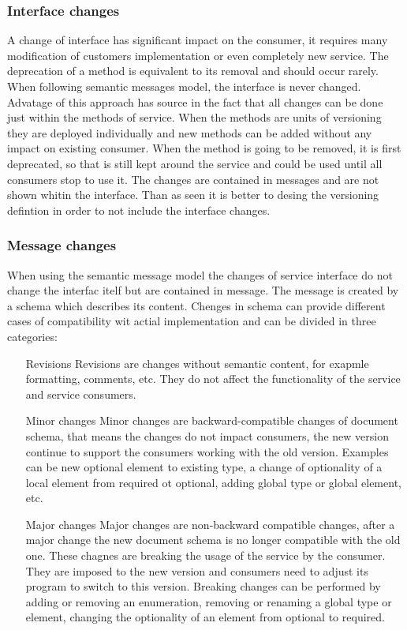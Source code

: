 \subsubsection{Interface changes}
A change of interface has significant impact on the consumer, it requires many modification of customers implementation or even completely new service. The deprecation of a method is equivalent to its removal and should occur rarely.
When following semantic messages model, the interface is never changed. Advatage of this approach has source in the fact that all changes can be done just within the methods of service. When the methods are units of versioning they are deployed individually and new methods can be added without any impact on existing consumer. When the method is going to be removed, it is first deprecated, so that is still kept around the service and could be used until all consumers stop to use it. The changes are contained in messages and are not shown whitin the interface.
Than as seen it is better to desing the versioning defintion in order to not include the interface changes.

\subsubsection{Message changes}
When using the semantic message model the changes of service interface do not change the interfac itelf but are contained in message. The message is created by a schema which describes its content. Chenges in schema can provide different cases of compatibility wit actial implementation and can be divided in three categories:

\begin{enumerate}
  \item[Revisions]
  Revisions are changes without semantic content, for exapmle formatting, comments, etc. They do not affect the functionality of the service and service consumers.
  
  \item[Minor changes]
  Minor changes are backward-compatible changes of document schema, that means the changes do not impact consumers, the new version continue to support the consumers working with the old version. Examples can be new optional element to existing type, a change of optionality of a local element from required ot optional, adding global type or global element, etc.
  
  \item[Major changes]
  Major changes are non-backward compatible changes, after a major change the new document schema is no longer compatible with the old one. These chagnes are breaking the usage of the service by the consumer. They are imposed to the new version and consumers need to adjust its program to switch to this version. Breaking changes can be performed by adding or removing an enumeration, removing or renaming a global type or element, changing the optionality of an element from optional to required.
\end{enumerate} 

